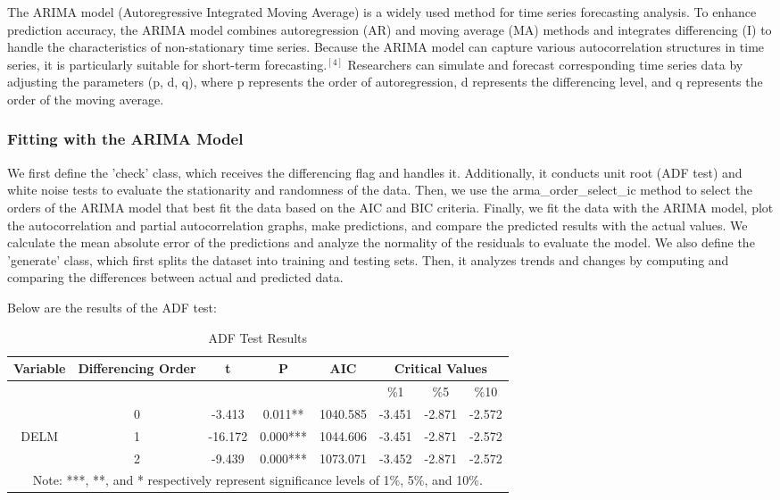 \documentclass[12pt]{article}
\begin{document}
The ARIMA model (Autoregressive Integrated Moving Average) is a widely used method for time series forecasting analysis. To enhance prediction accuracy, the ARIMA model combines autoregression (AR) and moving average (MA) methods and integrates differencing (I) to handle the characteristics of non-stationary time series. Because the ARIMA model can capture various autocorrelation structures in time series, it is particularly suitable for short-term forecasting.$ ^{[4]}$ Researchers can simulate and forecast corresponding time series data by adjusting the parameters (p, d, q), where p represents the order of autoregression, d represents the differencing level, and q represents the order of the moving average.

\subsubsection{Fitting with the ARIMA Model}

We first define the 'check' class, which receives the differencing flag and handles it. Additionally, it conducts unit root (ADF test) and white noise tests to evaluate the stationarity and randomness of the data. Then, we use the arma\_order\_select\_ic method to select the orders of the ARIMA model that best fit the data based on the AIC and BIC criteria. Finally, we fit the data with the ARIMA model, plot the autocorrelation and partial autocorrelation graphs, make predictions, and compare the predicted results with the actual values. We calculate the mean absolute error of the predictions and analyze the normality of the residuals to evaluate the model. We also define the 'generate' class, which first splits the dataset into training and testing sets. Then, it analyzes trends and changes by computing and comparing the differences between actual and predicted data.

Below are the results of the ADF test:

\begin{table}[H]
\begin{center}
\caption{ADF Test Results}
\begin{tabular}{cccccccc}
	\toprule
	\textbf{Variable} & \textbf{Differencing Order} & \textbf{t} & \textbf{P} & \textbf{AIC} & 			\multicolumn{3}{c}{\textbf{Critical Values}} \\
	\midrule
	 & & & & & \%1 &\%5 & \%10 \\
	\midrule
	 & 0 & -3.413 & 0.011** & 1040.585 & -3.451 & -2.871 & -2.572 \\
	DELM & 1 & -16.172 & 0.000*** & 1044.606 & -3.451& -2.871& -2.572 \\
	 & 2 & -9.439 & 0.000*** & 1073.071 & -3.452& -2.871& -2.572 \\
	\bottomrule
	\multicolumn{8}{c}{Note: ***, **, and * respectively represent significance levels of 1\%, 5\%, and 10\%.}
\end{tabular}\label{tb:adf}
\end{center}
\end{table}
\end{document}
